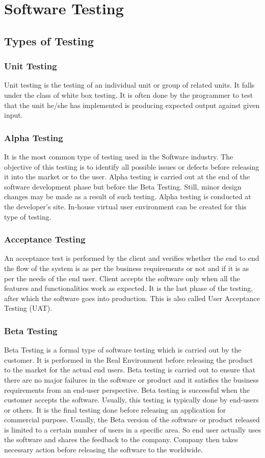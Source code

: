 \documentclass[oneside,a4paper,12pt]{report}
\begin{document}
{\chapter{Software Testing}
\section{Types of Testing}
\subsection{Unit Testing}
Unit testing is the testing of an individual unit or group of related units. It falls under the class of white box testing. It is often done by the programmer to test that the unit he/she has implemented is producing expected output against given input.
\subsection{Alpha Testing}
It is the most common type of testing used in the Software industry. The objective of this testing is to identify all possible issues or defects before releasing it into   the market or to the user. Alpha testing is carried out at the end of the software development phase but before the Beta Testing. Still, minor design changes may be made as a result of such testing. Alpha testing is conducted at the developer’s site. In-house virtual user environment can be created for this type of testing.
\subsection{Acceptance Testing}
An acceptance test is performed by the client and verifies whether the end to end the flow of the system is as per the business requirements or not and if it is as per the needs of the end user. Client accepts the software only when all the features and functionalities work as expected. It is the last phase of the testing, after which the software goes into production. This is also called User Acceptance Testing (UAT).
\subsection{Beta Testing}
Beta Testing is a formal type of software testing which is carried out by the customer. It is performed in the Real Environment before releasing the product to the market for the actual end users. Beta testing is carried out to ensure that there are no major failures in the software or product and it satisfies the business requirements from an end-user perspective. Beta testing is successful when the customer accepts the software. Usually, this testing is typically done by end-users or others. It is the  final testing done before releasing an application for commercial purpose. Usually, the Beta version of the software or product released is limited to a certain number of users in a specific area. So end user actually uses the software and shares the feedback to the company. Company then takes necessary action before releasing the software to the worldwide.
}
\end{document}
